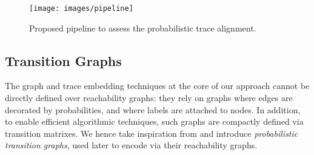 %
\begin{figure*}[t!]
	\hspace*{-1cm}\texttt{[image: images/pipeline]}
	\caption{Proposed pipeline to assess the probabilistic trace alignment.}\label{fig:pipe}
\end{figure*}



\subsection{Transition Graphs}\label{subsec:ppn}

The graph and trace embedding techniques at the core of our approach cannot be directly defined over reachability graphs: they rely on graphs where edges are decorated by probabilities, and where labels are attached to nodes. In addition, to enable efficient algorithmic techniques, such graphs are compactly defined via transition matrixes. We hence take inspiration from \cite{GartnerFW03} and introduce \emph{probabilistic transition graphs}, used later to encode  via their reachability graphs.

